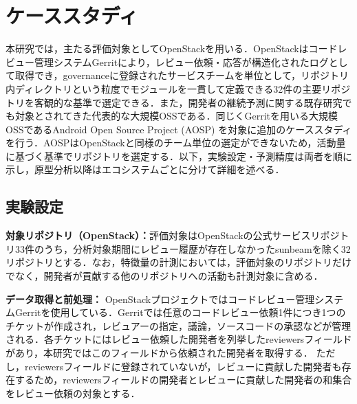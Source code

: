 \documentclass[submit,noauthor,ses,dvipdfmx]{ipsj}
\newcommand{\todo}[1]{\colorbox{yellow}{{\bf TODO}:}{\color{red} {\textbf{[#1]}}}}
\begin{document}
\section{ケーススタディ}\label{sec:case}
 本研究では，主たる評価対象としてOpenStackを用いる．OpenStackはコードレビュー管理システムGerritにより，レビュー依頼・応答が構造化されたログとして取得でき，governanceに登録されたサービスチームを単位として，リポジトリ内ディレクトリという粒度でモジュールを一貫して定義できる32件の主要リポジトリを客観的な基準で選定できる．また，開発者の継続予測に関する既存研究\cite{zhou}\cite{bao}\cite{constantinou}でも対象とされてきた代表的な大規模OSSである．同じくGerritを用いる大規模OSSであるAndroid Open Source Project (AOSP) を対象に追加のケーススタディを行う．AOSPはOpenStackと同様のチーム単位の選定ができないため，活動量に基づく基準でリポジトリを選定する．以下，実験設定・予測精度は両者を順に示し，原型分析以降はエコシステムごとに分けて詳細を述べる．
\vspace{-2mm}
\subsection{実験設定}

\noindent\textbf{対象リポジトリ（OpenStack）：}評価対象はOpenStackの公式サービスリポジトリ33件のうち，分析対象期間にレビュー履歴が存在しなかったsunbeamを除く32リポジトリとする．なお，特徴量の計測においては，評価対象のリポジトリだけでなく，開発者が貢献する他のリポジトリへの活動も計測対象に含める．

\noindent\textbf{データ取得と前処理：}
OpenStackプロジェクトではコードレビュー管理システムGerritを使用している．Gerritでは任意のコードレビュー依頼1件につき1つのチケットが作成され，レビュアーの指定，議論，ソースコードの承認などが管理される．各チケットにはレビュー依頼した開発者を列挙したreviewersフィールドがあり，本研究ではこのフィールドから依頼された開発者を取得する．
ただし，reviewersフィールドに登録されていないが，レビューに貢献した開発者も存在するため，reviewersフィールドの開発者とレビューに貢献した開発者の和集合をレビュー依頼の対象とする．
\end{document}
